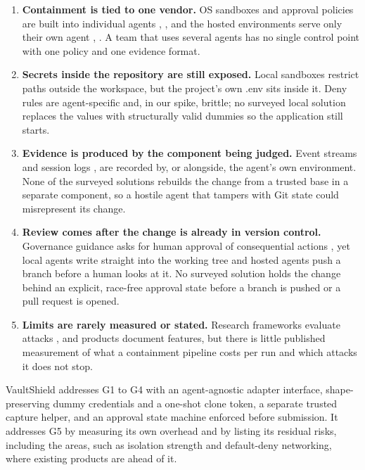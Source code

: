 \documentclass[12pt,a4paper,oneside]{report}
\providecommand{\tightlist}{\setlength{\itemsep}{0pt}\setlength{\parskip}{0pt}}
\newcommand{\EndInsertPages}[1]{\clearpage\renewcommand{\thepage}{\arabic{page}}\setcounter{page}{#1}}
\begin{document}
\begin{enumerate}
\def\labelenumi{G\arabic{enumi}.}
\tightlist
\item
  \textbf{Containment is tied to one vendor.} OS sandboxes and approval policies are built into individual agents \cite{ref16}, \cite{ref18}, and the hosted environments serve only their own agent \cite{ref18}, \cite{ref19}. A team that uses several agents has no single control point with one policy and one evidence format.
\item
  \textbf{Secrets inside the repository are still exposed.} Local sandboxes restrict paths outside the workspace, but the project's own .env sits inside it. Deny rules are agent-specific and, in our spike, brittle; no surveyed local solution replaces the values with structurally valid dummies so the application still starts.
\item
  \textbf{Evidence is produced by the component being judged.} Event streams and session logs \cite{ref4}, \cite{ref10} are recorded by, or alongside, the agent's own environment. None of the surveyed solutions rebuilds the change from a trusted base in a separate component, so a hostile agent that tampers with Git state could misrepresent its change.
\item
  \textbf{Review comes after the change is already in version control.} Governance guidance asks for human approval of consequential actions \cite{ref9}, yet local agents write straight into the working tree and hosted agents push a branch before a human looks at it. No surveyed solution holds the change behind an explicit, race-free approval state before a branch is pushed or a pull request is opened.
\item
  \textbf{Limits are rarely measured or stated.} Research frameworks evaluate attacks \cite{ref5}, \cite{ref6} and products document features, but there is little published measurement of what a containment pipeline costs per run and which attacks it does not stop.
\end{enumerate}

VaultShield addresses G1 to G4 with an agent-agnostic adapter interface, shape-preserving dummy credentials and a one-shot clone token, a separate trusted capture helper, and an approval state machine enforced before submission. It addresses G5 by measuring its own overhead and by listing its residual risks, including the areas, such as isolation strength and default-deny networking, where existing products are ahead of it.

\EndInsertPages{8}
\end{document}
